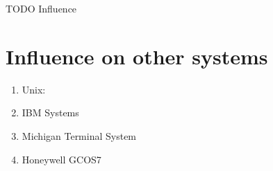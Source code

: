 TODO Influence

\section{Influence on other systems}
\begin{enumerate}
    \item Unix:

    \item IBM Systems
    
    \item Michigan Terminal System
    
    \item Honeywell GCOS7
\end{enumerate}